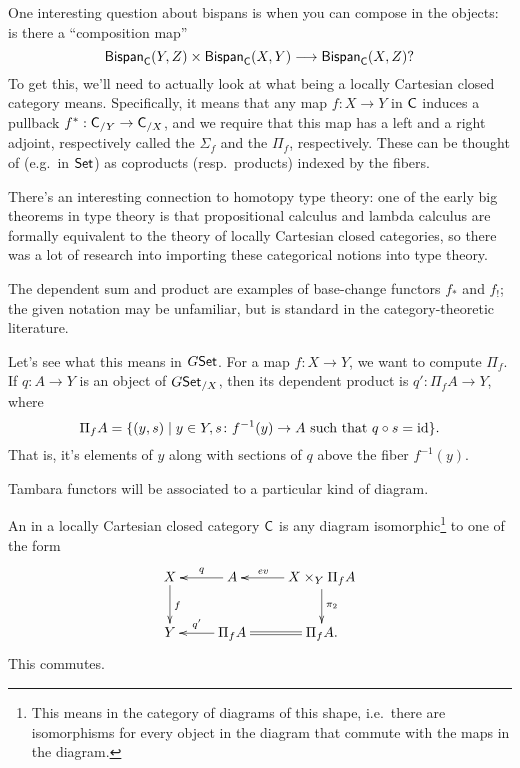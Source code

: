 One interesting question about bispans is when you can compose in the objects: is there a ``composition map''
\begin{equation}
\label{compbispan}
\mathsf{Bispan}_\mathsf C(Y,Z)\times\mathsf{Bispan}_\mathsf C(X,Y)\longrightarrow\mathsf{Bispan}_\mathsf C(X,Z)?
\end{equation}
To get this, we'll need to actually look at what being a locally Cartesian closed category means. Specifically, it
means that any map $f\colon X\to Y$ in $\mathsf C$ induces a pullback $f^*:\mathsf C_{/Y}\to\mathsf C_{/X}$, and we require that this
map has a left and a right adjoint, respectively called the  $\Sigma_f$ and the  $\Pi_f$, respectively. These can be thought of (e.g.\ in $\mathsf{Set}$) as coproducts (resp.\ products) indexed
by the fibers.
\begin{rem}
There's an interesting connection to homotopy type theory: one of the early big theorems in type theory is that
propositional calculus and lambda calculus are formally equivalent to the theory of locally Cartesian closed
categories, so there was a lot of research into importing these categorical notions into type theory.

The dependent sum and product are examples of base-change functors $f_*$ and $f_!$; the given notation may be
unfamiliar, but is standard in the category-theoretic literature.
\end{rem}
\begin{exm}
Let's see what this means in $G\mathsf{Set}$. For a map $f\colon X\to Y$, we want to compute $\Pi_f$. If $q\colon A\to Y$
is an object of $G\mathsf{Set}_{/X}$, then its dependent product is $q'\colon \Pi_fA\to Y$, where
\[\Pi_f A = \{(y,s)\mid y\in Y, s\colon f^{-1}(y)\to A\text{ such that } q\circ s = \mathrm{id}\}.\]
That is, it's elements of $y$ along with sections of $q$ above the fiber $f^{-1}(y)$.
\end{exm}
Tambara functors will be associated to a particular kind of diagram.
\begin{defn}
An  in a locally Cartesian closed category $\mathsf C$ is any diagram isomorphic\footnote{This
means in the category of diagrams of this shape, i.e.\ there are isomorphisms for every object in the diagram that
commute with the maps in the diagram.} to one of the form
\begin{equation}
\label{exponential}
\gathxy{
	X\ar[d]^f & A\ar[l]_-q & X\times_Y \Pi_f A\ar[l]_-{\mathit{ev}}\ar[d]^{\pi_2}\\
	Y & \Pi_f A\ar[l]_-{q'} & \Pi_fA.\ar@{=}[l]
}
\end{equation}
This commutes.
\end{defn}
